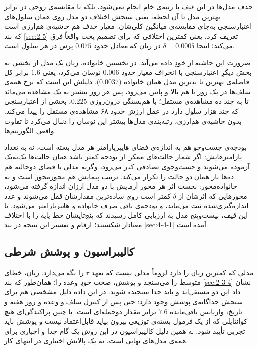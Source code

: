 حذف مدل‌ها در این قیف با رتبه‌ی خام انجام نمی‌شود، بلکه با مقایسه‌ی
زوجی در برابر بهترین مدل تا آن لحظه، یعنی سنجش اختلاف
دو مدل روی همان سلول‌های اعتبارسنجی به‌جای مقایسه‌ی میانگین کلی‌شان. معیار حذف هم
حاشیه‌ی هم‌ارزی است که بند \ref{sec:2-5} تعریف کرد، یعنی کمترین اختلافی که برای تصمیم
پخت واقعاً فرق می‌کند؛ اینجا $\delta = 0.0005$ در زیان  که معادل حدود
$0.075$ پرس در هر سلول است.

ضرورت این حاشیه از خودِ داده می‌آید. در نخستین خانواده، زیان یک مدل از بخشی به بخش
دیگرِ اعتبارسنجی با انحراف معیار حدود $0.006$ نوسان می‌کرد، یعنی $1.6$ برابر کل فاصله‌ی
بهترین تا بدترین مدل همان خانواده ($0.0037$). دلیلش این است که نرخ همه‌ی سلف‌ها در یک
روز با هم بالا و پایین می‌رود، پس هر روز بیشتر به یک مشاهده می‌مانَد تا به چند ده
مشاهده‌ی مستقل؛ با هم‌بستگی درون‌روزی $0.225$، بخشی از اعتبارسنجی که چند هزار سلول دارد
در عمل ارزش حدود ۶۸ مشاهده‌ی مستقل را پیدا می‌کند. بدون حاشیه‌ی هم‌ارزی، رتبه‌بندی
مدل‌ها بیشتر این نوسان را دنبال می‌کرد تا تفاوت واقعی الگوریتم‌ها.

بودجه‌ی جست‌وجو هم به اندازه‌ی فضای هایپرپارامتر هر مدل بسته است، نه به تعداد
پارامترهایش: اگر شمار حالت‌های ممکن از بودجه کمتر باشد همان حالت‌ها یک‌به‌یک آزموده
می‌شوند و جست‌وجوی تصادفی کنار می‌رود، وگرنه مدلی با فضای دوحالته هم ده‌ها بار همان دو
حالت را تکرار می‌کند. ترتیب پیمایش هم محورمحور است و نه خانواده‌محور: نخست اثر هر محور
آزمایش با دو مدل ارزان اندازه گرفته می‌شود، محورهایی که اثرشان از $\delta$ کمتر است
روی ساده‌ترین مقدارشان قفل می‌شوند و عدد اندازه‌گیری‌شده ثبت می‌ماند، و بودجه‌ی باقی صرف
خانواده و هایپرپارامتر می‌شود. با این قیف، بیست‌وپنج مدل به ارزیابی کامل رسیدند که
پنج‌تایشان خط پایه را با اختلاف معنادار شکستند؛ ارقام و تفسیر این نتیجه در بند
\ref{sec:4-4-1} آمده است.


\subsection{کالیبراسیون و پوشش شرطی}
\label{sec:3-2-5}

مدلی که کمترین زیان  را دارد لزوماً مدلی نیست که تعهد $\tau$ را نگه می‌دارد.
زیان، خطای متوسط را می‌سنجد و پوشش، صحت خودِ وعده را؛ همان‌طور که بند
\ref{sec:2-3-4} نشان داد این دو مستقل‌اند و باید جدا سنجیده شوند. در این داده دلیل مشخصی هم برای سنجش
جداگانه‌ی پوشش وجود دارد: حتی پس از کنترل سلف و وعده و روز هفته و تاریخ، واریانس
باقی‌مانده $7.6$ برابر مقدار دوجمله‌ای است. با چنین پراکندگی‌ای هیچ کوانتایلی که از یک
فرمول بسته‌ی توزیعی بیرون بیاید قابل‌اعتماد نیست و پوشش باید تجربی تأیید شود. به همین
دلیل کالیبراسیون در این روش یک گام جدا و اجباری برای همه‌ی مدل‌های نهایی است، نه یک
پالایش اختیاری در انتهای کار.

